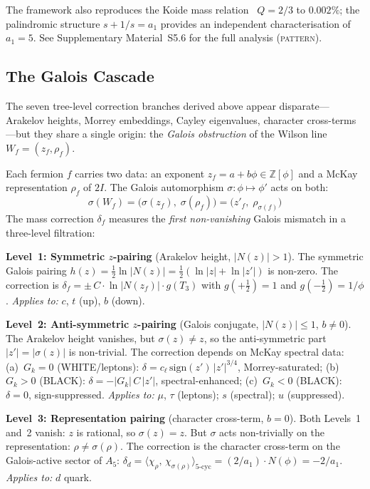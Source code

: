 \documentclass[12pt,a4paper]{article}
\theoremstyle{definition}
\begin{document}
The framework also reproduces the Koide mass relation~\cite{Koide1983} $Q = 2/3$ to $0.002\%$; the palindromic structure $s + 1/s = a_1$ provides an independent characterisation of $a_1 = 5$.  See Supplementary Material~S5.6 for the full analysis (\textsc{pattern}).

\subsection{The Galois Cascade}
\label{sec:galois_cascade}

The seven tree-level correction branches derived above appear disparate---Arakelov heights, Morrey embeddings, Cayley eigenvalues, character cross-terms---but they share a single origin: the \emph{Galois obstruction} of the Wilson line $W_f = (z_f, \rho_f)$.

Each fermion $f$ carries two data: an exponent $z_f = a + b\phi \in \mathbb{Z}[\phi]$ and a McKay representation $\rho_f$ of $2I$.  The Galois automorphism $\sigma: \phi \mapsto \phi'$ acts on both:
\begin{equation}
\sigma(W_f) = \bigl(\sigma(z_f),\; \sigma(\rho_f)\bigr) = \bigl(z'_f,\; \rho_{\sigma(f)}\bigr)
\end{equation}
The mass correction $\delta_f$ measures the \emph{first non-vanishing} Galois mismatch in a three-level filtration:

\noindent\textbf{Level~1: Symmetric $z$-pairing} (Arakelov height, $|N(z)| > 1$).
  The symmetric Galois pairing $h(z) = \tfrac{1}{2}\ln|N(z)| = \tfrac{1}{2}(\ln|z| + \ln|z'|)$ is non-zero.  The correction is
  $\delta_f = \pm\,C \cdot \ln|N(z_f)| \cdot g(T_3)$
  with $g(+\tfrac{1}{2}) = 1$ and $g(-\tfrac{1}{2}) = 1/\phi$.
  \emph{Applies to:} $c$, $t$ (up), $b$ (down).

\smallskip\noindent\textbf{Level~2: Anti-symmetric $z$-pairing} (Galois conjugate, $|N(z)| \leq 1$, $b \neq 0$).
  The Arakelov height vanishes, but $\sigma(z) \neq z$, so the anti-symmetric part $|z'| = |\sigma(z)|$ is non-trivial.  The correction depends on McKay spectral data:
  (a)~$G_k = 0$ (WHITE/leptons): $\delta = c_\ell\,\mathrm{sign}(z')\,|z'|^{3/4}$, Morrey-saturated;
  (b)~$G_k > 0$ (BLACK): $\delta = -|G_k|\,C\,|z'|$, spectral-enhanced;
  (c)~$G_k < 0$ (BLACK): $\delta = 0$, sign-suppressed.
  \emph{Applies to:} $\mu$, $\tau$ (leptons); $s$ (spectral); $u$ (suppressed).

\smallskip\noindent\textbf{Level~3: Representation pairing} (character cross-term, $b = 0$).
  Both Levels~1 and~2 vanish: $z$ is rational, so $\sigma(z) = z$.  But $\sigma$ acts non-trivially on the representation: $\rho \neq \sigma(\rho)$.  The correction is the character cross-term on the Galois-active sector of $A_5$:
  $\delta_d = \langle\chi_\rho,\,\chi_{\sigma(\rho)}\rangle_{\text{5-cyc}} = (2/a_1)\cdot N(\phi) = -2/a_1$.
  \emph{Applies to:} $d$ quark.
\end{document}
